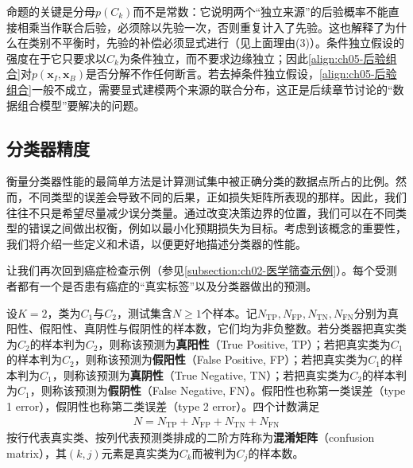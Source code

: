 \documentclass[../../main.tex]{subfiles}
\begin{document}
\begin{remark}
命题的关键是分母$p(C_k)$而不是常数：它说明两个“独立来源”的后验概率不能直接相乘当作联合后验，必须除以先验一次，否则重复计入了先验。这也解释了为什么在类别不平衡时，先验的补偿必须显式进行（见上面理由(3)）。条件独立假设的强度在于它只要求以$C_k$为条件独立，而不要求边缘独立；因此\eqref{align:ch05-后验组合}对$p(\boldsymbol{x}_{I},\boldsymbol{x}_{B})$是否分解不作任何断言。若去掉条件独立假设，\eqref{align:ch05-后验组合}一般不成立，需要显式建模两个来源的联合分布，这正是后续章节讨论的“数据组合模型”要解决的问题。
\end{remark}

\subsection{分类器精度}\label{subsection:ch05-分类器精度}

衡量分类器性能的最简单方法是计算测试集中被正确分类的数据点所占的比例。然而，不同类型的误差会导致不同的后果，正如损失矩阵所表现的那样。因此，我们往往不只是希望尽量减少误分类量。通过改变决策边界的位置，我们可以在不同类型的错误之间做出权衡，例如以最小化预期损失为目标。考虑到该概念的重要性，我们将介绍一些定义和术语，以便更好地描述分类器的性能。

让我们再次回到癌症检查示例（参见\cref{subsection:ch02-医学筛查示例}）。每个受测者都有一个是否患有癌症的“真实标签”以及分类器做出的预测。

\begin{definition}\label{definition:ch05-混淆矩阵}
设$K=2$，类为$C_1$与$C_2$，测试集含$N\geqslant1$个样本。记$N_{\mathrm{TP}},N_{\mathrm{FP}},N_{\mathrm{TN}},N_{\mathrm{FN}}$分别为真阳性、假阳性、真阴性与假阴性的样本数，它们均为非负整数。若分类器把真实类为$C_2$的样本判为$C_2$，则称该预测为\textbf{真阳性}（True Positive, TP）；若把真实类为$C_1$的样本判为$C_2$，则称该预测为\textbf{假阳性}（False Positive, FP）；若把真实类为$C_1$的样本判为$C_1$，则称该预测为\textbf{真阴性}（True Negative, TN）；若把真实类为$C_2$的样本判为$C_1$，则称该预测为\textbf{假阴性}（False Negative, FN）。假阳性也称第一类误差（type 1 error），假阴性也称第二类误差（type 2 error）。四个计数满足
\begin{align}
  N=N_{\mathrm{TP}}+N_{\mathrm{FP}}+N_{\mathrm{TN}}+N_{\mathrm{FN}}
  \label{align:ch05-计数分解}
\end{align}
按行代表真实类、按列代表预测类排成的二阶方阵称为\textbf{混淆矩阵}（confusion matrix），其$(k,j)$元素是真实类为$C_k$而被判为$C_j$的样本数。
\end{definition}
\end{document}
